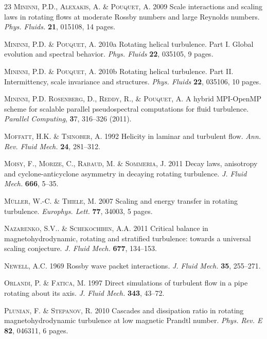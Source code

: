 \documentclass[aps,amsmath,amssymb,floatfix,showpacs]{revtex4}
\begin{document}
\begin{thebibliography}{23}
\textsc{Mininni, P.D., Alexakis, A. \& Pouquet, A.}
2009 Scale interactions and scaling laws in rotating flows at moderate Rossby numbers and large Reynolds numbers.
\emph{Phys. Fluids.} \textbf{21}, 015108, 14 pages.

\textsc{Mininni, P.D. \& Pouquet, A.}
2010a Rotating helical turbulence. Part I. Global evolution and spectral behavior.
\emph{Phys. Fluids} \textbf{22}, 035105, 9 pages.
  
\textsc{Mininni, P.D. \& Pouquet, A.}
2010b Rotating helical turbulence. Part II. Intermittency, scale invariance and structures.
\emph{Phys. Fluids} \textbf{22}, 035106, 10 pages.

\textsc{Mininni, P.D. Rosenberg, D., Reddy, R., \& Pouquet, A.}
A hybrid MPI-OpenMP scheme for scalable parallel pseudospectral computations for
fluid turbulence.
 \emph {Parallel Computing}, {\textbf 37}, 316--326 (2011). 

\textsc{Moffatt, H.K. \& Tsinober, A.}
1992 Helicity in laminar and turbulent flow.
\emph{Ann. Rev. Fluid Mech.} \textbf{24}, 281--312.

\textsc{Moisy, F., Morize, C., Rabaud, M. \& Sommeria, J.}
2011 Decay laws, anisotropy and cyclone-anticyclone asymmetry in decaying rotating turbulence.
\emph{J. Fluid Mech.} \textbf{666}, 5--35.

\textsc{M\"uller, W.-C. \& Thiele, M.}
2007 Scaling and energy transfer in rotating turbulence.
\emph{Europhys. Lett.} \textbf{77}, 34003, 5 pages.

\textsc{Nazarenko, S.V.. \& Schekochihin, A.A.}
2011 Critical balance in magnetohydrodynamic, rotating and stratified turbulence: towards a universal scaling conjecture. 
\emph{J. Fluid Mech.} \textbf{677}, 134--153.

\textsc{Newell, A.C.}
1969 Rossby wave packet interactions.
\emph{J. Fluid Mech.} \textbf{35}, 255--271.

\textsc{Orlandi, P. \& Fatica, M.}
1997 Direct simulations of turbulent flow in a pipe rotating about its axis.
\emph{J. Fluid Mech.} \textbf{343}, 43--72.

\textsc{Plunian, F. \& Stepanov, R.}
2010 Cascades and dissipation ratio in rotating magnetohydrodynamic turbulence
at low magnetic Prandtl number.
\emph{Phys. Rev. E} \textbf{82}, 046311, 6 pages.


\end{thebibliography}
\end{document}

